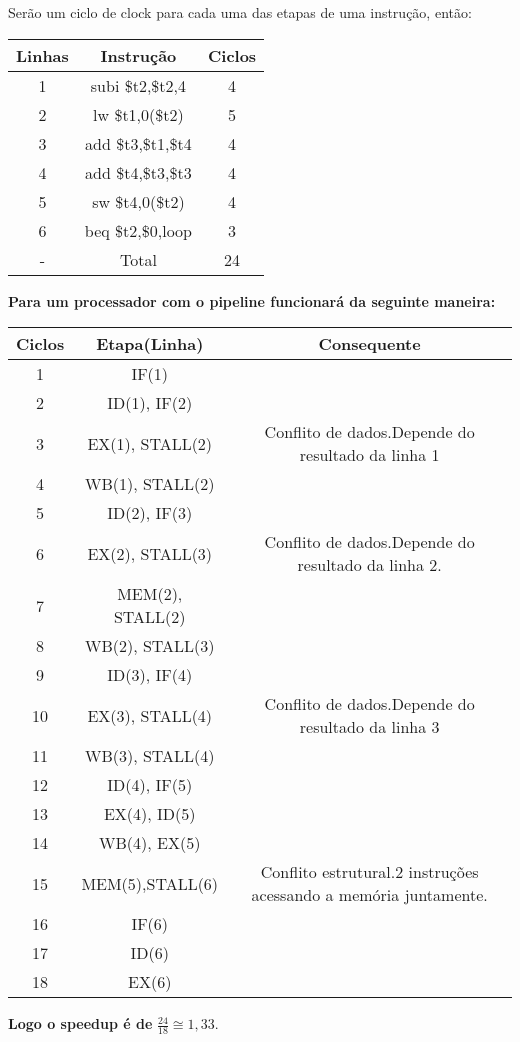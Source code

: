 \documentclass[12pt,a4paper]{article}
\begin{document}
\begin{titlepage}
\begin{enumerate}[1)]
{	Serão um ciclo de clock para cada uma das etapas de uma instrução, então:}
	\begin{center}
	\begin{tabular}{|c|c|c|}
		\hline
		Linhas & Instrução & Ciclos \\ \hline
		1 & subi \$t2,\$t2,4 & 4 \\ \hline
		2 & lw \$t1,0(\$t2) & 5 \\ \hline
		3 & add \$t3,\$t1,\$t4 & 4 \\ \hline
		4 & add \$t4,\$t3,\$t3 & 4 \\ \hline
		5 & sw \$t4,0(\$t2) & 4 \\ \hline
		6 & beq \$t2,\$0,loop & 3 \\ \hline
		- & Total & 24 \\ \hline			
	\end{tabular}
	\end{center}
	\textbf{Para um processador com o pipeline funcionará da seguinte maneira:}
	\begin{center}
		\begin{tabular}{|c|c|c|}
			\hline
			Ciclos & Etapa(Linha) & Consequente \\ \hline
			1 & IF(1)&  \\ \hline
			2 & ID(1), IF(2)&  \\ \hline
			3 & EX(1), STALL(2) & Conflito de dados.Depende do resultado da linha 1\\ \hline
			4 & WB(1), STALL(2) &  \\ \hline
			5 & ID(2), IF(3) &  \\ \hline
			6 & EX(2), STALL(3) &  Conflito de dados.Depende do resultado da linha 2. \\ \hline
			7 & MEM(2), STALL(2) &  \\ \hline
			8 & WB(2), STALL(3) &  \\ \hline
			9 & ID(3), IF(4) &  \\ \hline
			10 & EX(3), STALL(4)&Conflito de dados.Depende do resultado da linha 3\\ \hline
			11 & WB(3), STALL(4) &  \\ \hline
			12 & ID(4), IF(5) &  \\ \hline
			13 & EX(4), ID(5) &  \\ \hline
			14 & WB(4), EX(5) &  \\ \hline
			15& MEM(5),STALL(6)&Conflito estrutural.2 instruções acessando a memória juntamente. \\ \hline
			16 &  IF(6)&  \\ \hline
			17 & ID(6) &  \\ \hline
			18 & EX(6) &  \\ \hline			
		\end{tabular}
	\end{center}
	\textbf{Logo o speedup é de  }$\frac{24}{18}\cong 1,33$.
	

\end{enumerate}
\end{titlepage}
\end{document}
